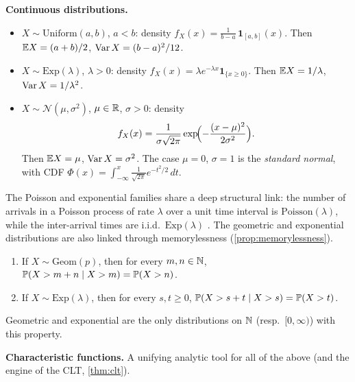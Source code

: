 \medskip
\noindent\textbf{Continuous distributions.}

\begin{definition}
\label{def:continuous-distributions}
\hphantom{x}
\begin{itemize}
  \item $X \sim \mathrm{Uniform}(a, b)$, $a < b$: density
        $f_X(x) = \frac{1}{b - a}\, \mathbf{1}_{[a, b]}(x)$. Then
        $\mathbb{E} X = (a + b)/2$, $\operatorname{Var} X = (b - a)^2 / 12$.
  \item $X \sim \mathrm{Exp}(\lambda)$, $\lambda > 0$: density
        $f_X(x) = \lambda e^{-\lambda x} \mathbf{1}_{\{x \geq 0\}}$. Then
        $\mathbb{E} X = 1/\lambda$, $\operatorname{Var} X = 1/\lambda^2$.
  \item $X \sim \mathcal{N}(\mu, \sigma^2)$, $\mu \in \mathbb{R}$, $\sigma > 0$:
        density
        \[
          f_X(x) = \frac{1}{\sigma \sqrt{2\pi}} \exp\!\Bigl(-\frac{(x - \mu)^2}{2\sigma^2}\Bigr).
        \]
        Then $\mathbb{E} X = \mu$, $\operatorname{Var} X = \sigma^2$. The case $\mu = 0$,
        $\sigma = 1$ is the \emph{standard normal}, with CDF
        $\Phi(x) = \int_{-\infty}^{x} \tfrac{1}{\sqrt{2\pi}} e^{-t^2/2}\, dt$.
\end{itemize}
\end{definition}

The Poisson and exponential families share a deep structural link:
the number of arrivals in a Poisson process of rate $\lambda$ over a
unit time interval is $\mathrm{Poisson}(\lambda)$, while the
inter-arrival times are i.i.d.\ $\mathrm{Exp}(\lambda)$
\cite[Ch.~II, \S~3]{Sevastyanov1982}. The geometric and exponential
distributions are also linked through memorylessness
(\cref{prop:memorylessness}).

\begin{proposition}[Memorylessness]
\label{prop:memorylessness}
\hphantom{x}
\begin{enumerate}[label=(\alph*)]
  \item If $X \sim \mathrm{Geom}(p)$, then for every
        $m, n \in \mathbb{N}$, $\mathbb{P}(X > m + n \mid X > m) = \mathbb{P}(X > n)$.
  \item If $X \sim \mathrm{Exp}(\lambda)$, then for every
        $s, t \geq 0$, $\mathbb{P}(X > s + t \mid X > s) = \mathbb{P}(X > t)$.
\end{enumerate}
Geometric and exponential are the only distributions on $\mathbb{N}$
(resp.\ $[0, \infty)$) with this property.
\end{proposition}

\medskip
\noindent\textbf{Characteristic functions.} A unifying analytic tool
for all of the above (and the engine of the CLT,
\cref{thm:clt}).

